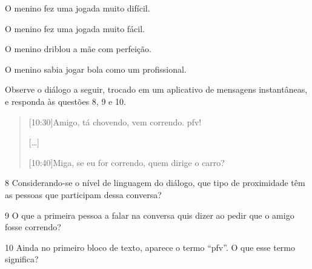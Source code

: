\begin{escolha}
\item O menino fez uma jogada muito difícil.
\item O menino fez uma jogada muito fácil.
\item O menino driblou a mãe com perfeição.
\item O menino sabia jogar bola como um profissional.
\end{escolha}


\noindent Observe o diálogo a seguir, trocado em um aplicativo de mensagens
instantâneas, e responda às questões 8, 9 e 10.

\begin{quote}
{[}10:30{]}\quad Amigo, tá chovendo, vem correndo. pfv!

{[}\ldots{]}

{[}10:40{]}\quad Miga, se eu for correndo, quem dirige o carro?
\end{quote}

\num{8} Considerando-se o nível de linguagem do diálogo, que tipo de
proximidade têm as pessoas que participam dessa conversa?


\num{9} O que a primeira pessoa a falar na conversa quis dizer ao pedir
que o amigo fosse correndo?


\num{10} Ainda no primeiro bloco de texto, aparece o termo ``pfv''. O
que esse termo significa?

